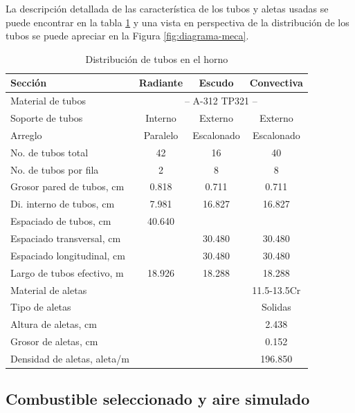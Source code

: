 \par La descripción detallada de las característica de los tubos y aletas usadas se puede encontrar en la tabla \ref{tbl:tubes} y una vista en perspectiva de la distribución de los tubos se puede apreciar en la Figura \ref{fig:diagrama-meca}.

\begin{table}
\begin{center}
\caption[Distribución de tubos en el horno]{Distribución de tubos en el horno}
\label{tbl:tubes}
\begin{tabular}{l|c|c|c}
Sección 					& Radiante			& Escudo			& Convectiva \\
\hline
Material de tubos			& \multicolumn{3}{c}{-- A-312 TP321 --} \\
Soporte de tubos    		& Interno			& Externo			& Externo		\\
Arreglo			    		& Paralelo			& Escalonado		& Escalonado	\\
No. de tubos total    		& 42				& 16				& 40			\\
No. de tubos por fila		& 2					& 8					& 8				\\
Grosor pared de tubos, cm	& 0.818				& 0.711				& 0.711			\\
Di. interno de tubos, cm	& 7.981				& 16.827			& 16.827		\\
Espaciado de tubos, cm  	& 40.640			& 					& 				\\
Espaciado transversal, cm  	&					& 30.480			& 30.480		\\
Espaciado longitudinal, cm 	&					& 30.480			& 30.480		\\
Largo de tubos efectivo, m	& 18.926			& 18.288			& 18.288		\\
\hline
Material de aletas			&					& 					& 11.5-13.5Cr	\\
Tipo de aletas				&					& 					& Solidas		\\	
Altura de aletas, cm		&					& 					& 2.438			\\
Grosor de aletas, cm		&					& 					& 0.152			\\
Densidad de aletas, aleta/m	& 					& 					& 196.850		\\
\end{tabular}
\end{center}
\end{table}

\subsection{Combustible seleccionado y aire simulado}

